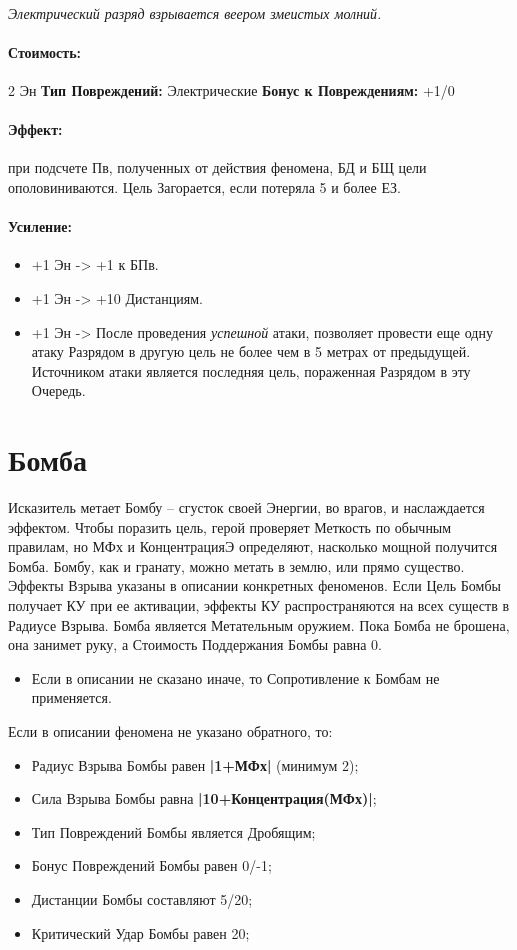 \paragraph{} 
\textit{Электрический разряд взрывается веером змеистых молний.}
\paragraph{Стоимость: }2 Эн
\newline
\textbf{Тип Повреждений: }Электрические
\newline
\textbf{Бонус к Повреждениям: }+1/0
\paragraph{Эффект: }при подсчете Пв, полученных от действия феномена, БД и БЩ цели ополовиниваются. Цель Загорается, если потеряла 5 и более ЕЗ.
\paragraph{Усиление:}
\begin{itemize}
\item+1 Эн -> +1 к БПв.
\item+1 Эн -> +10 Дистанциям.
\item+1 Эн -> После проведения 
\textit{успешной} атаки, позволяет провести еще одну атаку Разрядом в другую цель не более чем в 5 метрах от предыдущей. Источником атаки является последняя цель, пораженная Разрядом в эту Очередь.
\end{itemize}
\section{Бомба}Исказитель метает Бомбу – сгусток своей Энергии, во врагов, и наслаждается эффектом. Чтобы поразить цель, герой проверяет Меткость по обычным правилам, но МФх и КонцентрацияЭ определяют, насколько мощной получится Бомба. Бомбу, как и гранату, можно метать в землю, или прямо существо. Эффекты Взрыва указаны в описании конкретных феноменов. Если Цель Бомбы получает КУ при ее активации, эффекты КУ распространяются на всех существ в Радиусе Взрыва.
\newline Бомба является Метательным оружием. Пока Бомба не брошена, она занимет руку, а Стоимость Поддержания Бомбы равна 0. 
\begin{itemize}
\item Если в описании не сказано иначе, то Сопротивление к Бомбам не применяется.
\end{itemize}Если в описании феномена не указано обратного, то:
\begin{itemize}
\item Радиус Взрыва Бомбы равен 
\textbf{|1+МФх|} (минимум 2);
\item Сила Взрыва Бомбы равна 
\textbf{|10+Концентрация(МФх)|};
\item Тип Повреждений Бомбы является Дробящим;
\item Бонус Повреждений Бомбы равен 0/-1;
\item Дистанции Бомбы составляют 5/20;
\item Критический Удар Бомбы равен 20;
\end{itemize}
